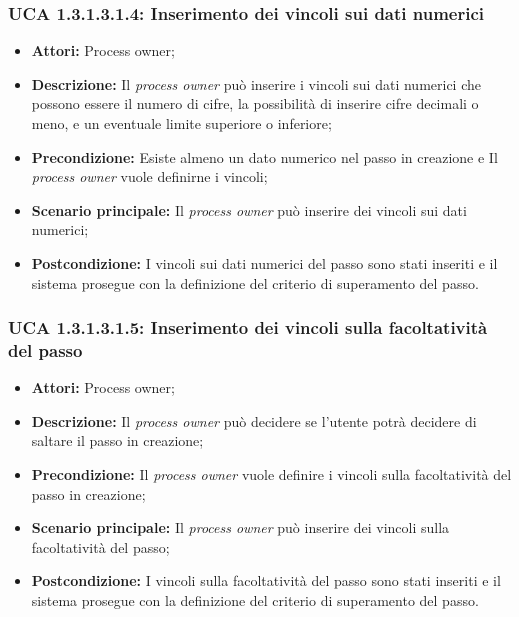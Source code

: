 \hypertarget{A1.3.1.3.1.4}{}
\subsubsection{UCA 1.3.1.3.1.4: Inserimento dei vincoli sui dati numerici}
\begin{itemize}
\item \textbf{Attori:} Process owner;
\item \textbf{Descrizione:}
Il \textit{process owner} può inserire i vincoli sui dati numerici che possono essere il numero di cifre, la possibilità di inserire cifre decimali o meno, e un eventuale limite superiore o inferiore;
\item \textbf{Precondizione:}
Esiste almeno un dato numerico nel passo in creazione e Il \textit{process owner} vuole definirne i vincoli;
\item \textbf{Scenario principale:}
Il \textit{process owner} può inserire dei vincoli sui dati numerici;
\item \textbf{Postcondizione:}
I vincoli sui dati numerici del passo sono stati inseriti e il sistema prosegue con la definizione del criterio di superamento del passo.
\end{itemize}

\hypertarget{A1.3.1.3.1.5}{}
\subsubsection{UCA 1.3.1.3.1.5: Inserimento dei vincoli sulla facoltatività del passo}
\begin{itemize}
\item \textbf{Attori:} Process owner;
\item \textbf{Descrizione:}
Il \textit{process owner} può decidere se l'utente potrà decidere di saltare il passo in creazione;
\item \textbf{Precondizione:}
Il \textit{process owner} vuole definire i vincoli sulla facoltatività del passo in creazione;
\item \textbf{Scenario principale:}
Il \textit{process owner} può inserire dei vincoli sulla facoltatività del passo;
\item \textbf{Postcondizione:}
I vincoli sulla facoltatività del passo sono stati inseriti e il sistema prosegue con la definizione del criterio di superamento del passo.
\end{itemize}

